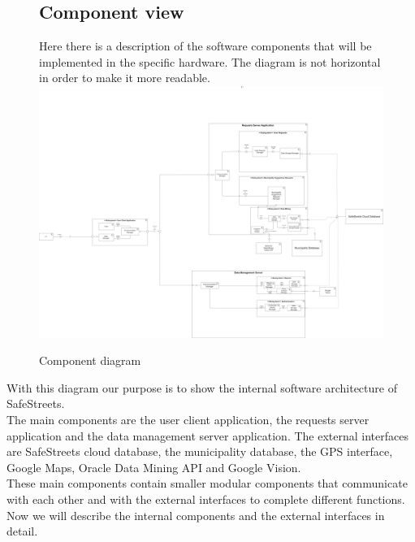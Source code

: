 \documentclass[titlepage]{article}
\begin{document}
\begin{figure}[h]
\subsection{Component view}
Here there is a description of the software components that will be implemented in the specific hardware. The diagram is not horizontal in order to make it more readable. 
\\
	\includegraphics[scale=0.133, angle=-90]{Diagrams/Component diagram.png}
	\caption{Component diagram}
\end{figure}
\FloatBarrier

With this diagram our purpose is to show the internal software architecture of SafeStreets. \\
The main components are the user client application, the requests server application and the data management server application. The external interfaces are SafeStreets cloud database, the municipality database, the GPS interface, Google Maps, Oracle Data Mining API and Google Vision.\\
These main components contain smaller modular components that communicate with each other and with the external interfaces to complete different functions.\\
Now we will describe the internal components and the external interfaces in detail. \\
\end{document}
